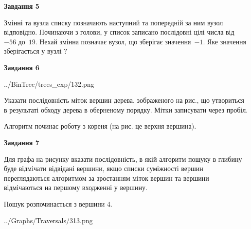 \documentclass[12pt, ukrainian]{article}
\begin{document}
{\begin {large}
{\begin {center}\textbf{Завдання 5}\end {center}}\par
Змінні  та  вузла списку позначають наступний та попередній за ним вузол відповідно. Починаючи з голови, у список записано послідовні цілі числа від~$-56$ до~$19$. Нехай змінна  позначає вузол, що зберігає значення~$-1$.
Яке значення зберігається у вузлі  ?\par
\newpage

{\begin {center}\textbf{Завдання 6}\end {center}}\par

\begin{center}
	{../BinTree/trees_exp/132.png}
\end{center}
Указати послідовність міток вершин дерева, зображеного на рис., що утвориться в результаті обходу дерева в оберненому порядку. Мітки записувати через пробіл.\par Алгоритм починає роботу з кореня (на рис. це верхня вершина).\par
\newpage

{\begin {center}\textbf{Завдання 7}\end {center}}\par
Для графа на рисунку вказати послідовність, в якій алгоритм пошуку в глибину буде відмічати відвідані вершини, якщо списки суміжності вершин переглядаються алгоритмом за зростанням міток вершин та вершини відмічаються на першому вход\-женні у вершину.\par
Пошук розпочинається з вершини 4.\par

\begin{center}
	{../Graphs/Traversals/313.png}
\end{center}\par
\newpage


\end{large}}
\end{document}
